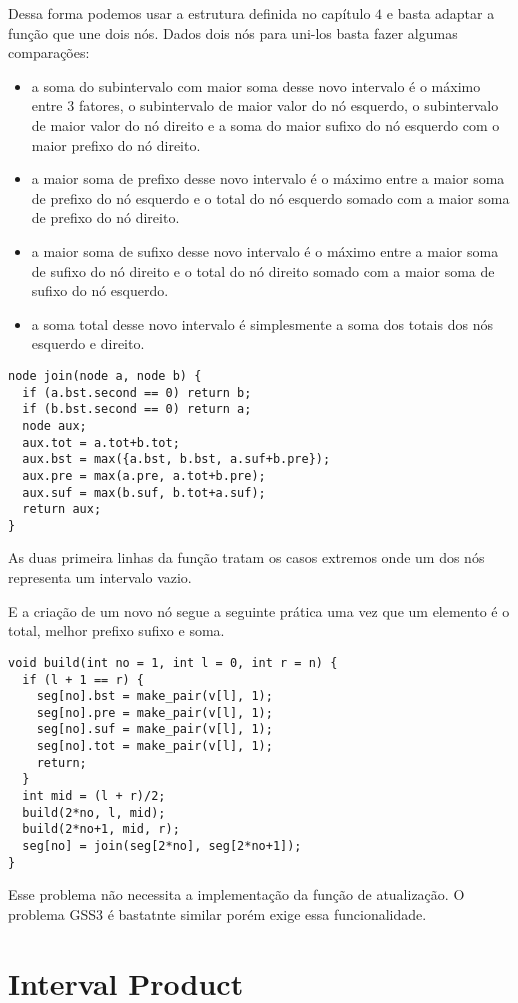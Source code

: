 Dessa forma podemos usar a estrutura definida no capítulo $4$ e basta adaptar a função que une dois nós. Dados dois nós para uni-los basta fazer algumas comparações:
\begin{itemize}
    \item a soma do subintervalo com maior soma desse novo intervalo é o máximo entre $3$ fatores, o subintervalo de maior valor do nó esquerdo, o subintervalo de maior valor do nó direito e a soma do maior sufixo do nó esquerdo com o maior prefixo do nó direito.
    \item a maior soma de prefixo desse novo intervalo é o máximo entre a maior soma de prefixo do nó esquerdo e o total do nó esquerdo somado com a maior soma de prefixo do nó direito.
    \item a maior soma de sufixo desse novo intervalo é o máximo entre a maior soma de sufixo do nó direito e o total do nó direito somado com a maior soma de sufixo do nó esquerdo.\
    \item a soma total desse novo intervalo é simplesmente a soma dos totais dos nós esquerdo e direito.
\end{itemize}

\begin{lstlisting}
node join(node a, node b) {
  if (a.bst.second == 0) return b;
  if (b.bst.second == 0) return a;
  node aux;
  aux.tot = a.tot+b.tot;
  aux.bst = max({a.bst, b.bst, a.suf+b.pre});
  aux.pre = max(a.pre, a.tot+b.pre);
  aux.suf = max(b.suf, b.tot+a.suf);
  return aux;
}
\end{lstlisting}
As duas primeira linhas da função tratam os casos extremos onde um dos nós representa um intervalo vazio.

E a criação de um novo nó segue a seguinte prática uma vez que um elemento é o total, melhor prefixo sufixo e soma.
\begin{lstlisting}
void build(int no = 1, int l = 0, int r = n) {
  if (l + 1 == r) {
    seg[no].bst = make_pair(v[l], 1);
    seg[no].pre = make_pair(v[l], 1);
    seg[no].suf = make_pair(v[l], 1);
    seg[no].tot = make_pair(v[l], 1);
    return;
  }
  int mid = (l + r)/2;
  build(2*no, l, mid);
  build(2*no+1, mid, r);
  seg[no] = join(seg[2*no], seg[2*no+1]);
}
\end{lstlisting}

Esse problema não necessita a implementação da função de atualização. O problema GSS3 é bastatnte similar porém exige essa funcionalidade.

\section{Interval Product}
